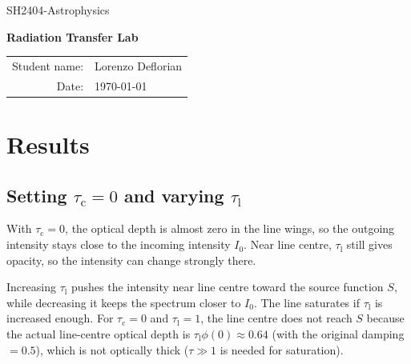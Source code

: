 \documentclass[a4paper,11pt]{article}
\newcommand{\coursename}{SH2404-Astrophysics}
\newcommand{\labtitle}{Radiation Transfer Lab}
\newcommand{\studentname}{Lorenzo Deflorian}
\newcommand{\reportdate}{\today}
\begin{document}
\begin{titlepage}
    \centering
    \vspace*{2cm}

    {\Large \coursename\par}
    \vspace{2cm}

    {\huge\bfseries \labtitle\par}
    \vspace{2.5cm}

    \begin{tabular}{rl}
        Student name: & \studentname \\
        Date:         & \reportdate \\
    \end{tabular}

    \vfill
\end{titlepage}

\tableofcontents
\clearpage

\section{Results}

\subsection{Setting $\tau_{\mathrm{c}} = 0$ and varying $\tau_{\mathrm{l}}$}
\label{sec:q1}

With $\tau_{\mathrm{c}} = 0$, the optical depth is almost zero in the line wings, so the outgoing intensity stays close to the incoming intensity $I_0$. Near line centre, $\tau_{\mathrm{l}}$ still gives opacity, so the intensity can change strongly there.

Increasing $\tau_{\mathrm{l}}$ pushes the intensity near line centre toward the source function $S$, while decreasing it keeps the spectrum closer to $I_0$. The line saturates if $\tau_{\mathrm{l}}$ is increased enough. For $\tau_{\mathrm{c}} = 0$ and $\tau_{\mathrm{l}} = 1$, the line centre does not reach $S$ because the actual line-centre optical depth is $\tau_{\mathrm{l}}\phi(0) \approx 0.64$ (with the original damping $= 0.5$), which is not optically thick ($\tau \gg 1$ is needed for saturation).
\end{document}
